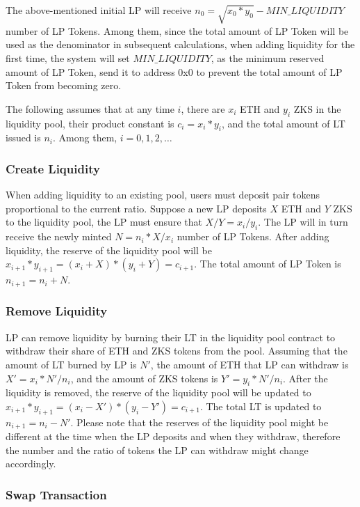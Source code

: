 \documentclass[]{template/llncs}
\begin{document}
The above-mentioned initial LP will receive $n_0 = \sqrt {x_0 * y_0} - MIN\_LIQUIDITY$ number of LP Tokens. Among them, since the total amount of LP Token will be used as the denominator in subsequent calculations, when adding liquidity for the first time, the system will set $MIN\_LIQUIDITY$, as the minimum reserved amount of LP Token, send it to address 0x0 to prevent the total amount of LP Token from becoming zero.

The following assumes that at any time $i$, there are $x_i$ ETH and $y_i$ ZKS in the liquidity pool, their product constant is $c_i = x_i * y_i$, and the total amount of LT issued is $n_i$. Among them, $i = 0, 1, 2, …$

\subsubsection{Create Liquidity}

When adding liquidity to an existing pool, users must deposit pair tokens proportional to the current ratio. Suppose a new LP deposits $X$ ETH and $Y$ ZKS to the liquidity pool, the LP must ensure that $X/Y = x_i/y_i$. The LP will in turn receive the newly minted $N = n_i*X/x_i$ number of LP Tokens. After adding liquidity, the reserve of the liquidity pool will be $x_{i+1}*y_{i+1} = (x_i+X)*(y_i+Y) = c_{i+1}$. The total amount of LP Token is $n_{i+1} = n_i + N$.


\subsubsection{Remove Liquidity}

LP can remove liquidity by burning their LT in the liquidity pool contract to withdraw their share of ETH and ZKS tokens from the pool. Assuming that the amount of LT burned by LP is $N'$, the amount of ETH that LP can withdraw is $X'= x_i*N'/n_i$, and the amount of ZKS tokens is $Y'= y_i*N'/n_i$. After the liquidity is removed, the reserve of the liquidity pool will be updated to $x_{i+1}*y_{i+1} = (x_i-X')*(y_i-Y') = c_{i+1}$. The total LT is updated to $n_{i+1} = n_i-N'$. Please note that the reserves of the liquidity pool might be different at the time when the LP deposits and when they withdraw, therefore the number and the ratio of tokens the LP can withdraw might change accordingly.  


\subsubsection{Swap Transaction}
\end{document}
